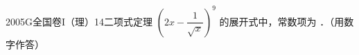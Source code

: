 
\begin{problem}{2005}{G}{全国卷I（理）}{14}{二项式定理}
$ \left(2x-\dfrac{1}{\sqrt{x}}\right)^9 $ 的展开式中，常数项为 \underline{\hspace{4em}}．（用数字作答）
\end{problem}

\begin{answer}

\end{answer}

\begin{solutions}

\end{solutions}